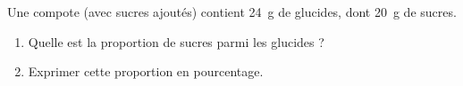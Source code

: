 
\begin{exercice}\label{exo2smath-0298}

    Une compote (avec sucres ajoutés) contient \SI{24}{\gram} de glucides, dont \SI{20}{\gram} de sucres.
    \begin{enumerate}
        \item
            Quelle est la proportion de sucres parmi les glucides ?
        \item
            Exprimer cette proportion en pourcentage.
    \end{enumerate}

\end{exercice}
